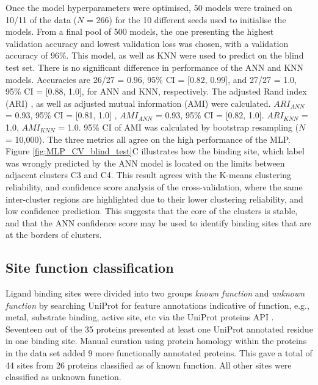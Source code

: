 Once the model hyperparameters were optimised, 50 models were trained on 10/11 of the data ($N$ = 266) for the 10 different seeds used to initialise the models. From a final pool of 500 models, the one presenting the highest validation accuracy and lowest validation loss was chosen, with a validation accuracy of 96\%. This model, as well as KNN were used to predict on the blind test set. There is no significant difference in performance of the ANN and KNN models. Accuracies are 26/27 = 0.96, 95\% CI = [0.82, 0.99], and 27/27 = 1.0, 95\% CI = [0.88, 1.0], for ANN and KNN, respectively. The adjusted Rand index (ARI) \cite{RAND_1971_ARI, HUBERT_1985_ARI}, as well as adjusted mutual information (AMI) \cite{VINH_2009_AMI, VINH_2010_AMI} were calculated. $ARI_{ANN}$ = 0.93, 95\% CI = [0.81, 1.0] \cite{STEINLEY_2016_ARI}, $AMI_{ANN}$ = 0.93, 95\% CI = [0.82, 1.0]. $ARI_{KNN}$ = 1.0, $AMI_{KNN}$ = 1.0. 95\% CI of AMI was calculated by bootstrap resampling ($N$ = 10,000). The three metrics all agree on the high performance of the MLP. Figure \ref{fig:MLP_CV_blind_test}C illustrates how the binding site, which label was wrongly predicted by the ANN model is located on the limits between adjacent clusters C3 and C4. This result agrees with the K-means clustering reliability, and confidence score analysis of the cross-validation, where the same inter-cluster regions are highlighted due to their lower clustering reliability, and low confidence prediction. This suggests that the core of the clusters is stable, and that the ANN confidence score may be used to identify binding sites that are at the borders of clusters.

\subsection{Site function classification}

Ligand binding sites were divided into two groups \textit{known function} and \textit{unknown function} by searching UniProt \cite{UNIPROT_2019_UNIPROT} for feature annotations indicative of function, e.g., metal, substrate binding, active site, etc via the UniProt proteins API \cite{NIGHTINGALE_2017_API}. Seventeen out of the 35 proteins presented at least one UniProt annotated residue in one binding site. Manual curation using protein homology within the proteins in the data set added 9 more functionally annotated proteins. This gave a total of 44 sites from 26 proteins classified as of known function. All other sites were classified as unknown function.

